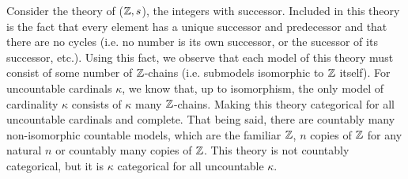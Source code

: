 \begin{example}\label{example_categoricity_integers}
Consider the theory of (\(\mathbb{Z}, s\)), the integers with successor. 
Included in this theory is the fact that every element has a unique successor and predecessor and that there are no cycles (i.e. no number is its own successor, or the sucessor of its successor, etc.). 
Using this fact, we observe that each model of this theory must consist of some number of \(\mathbb{Z}\)-chains (i.e. submodels isomorphic to \(\mathbb{Z}\) itself). 
For uncountable cardinals \(\kappa\), we know that, up to isomorphism, the only model of cardinality \(\kappa\) consists of \(\kappa\) many \(\mathbb{Z}\)-chains. 
Making this theory categorical for all uncountable cardinals and complete. 
That being said, there are countably many non-isomorphic countable models, which are the familiar \(\mathbb{Z}\), \(n\) copies of \(\mathbb{Z}\) for any natural \(n\) or countably many copies of \(\mathbb{Z}\). 
This theory is not countably categorical, but it is \(\kappa\) categorical for all uncountable \(\kappa\). 
\end{example}

